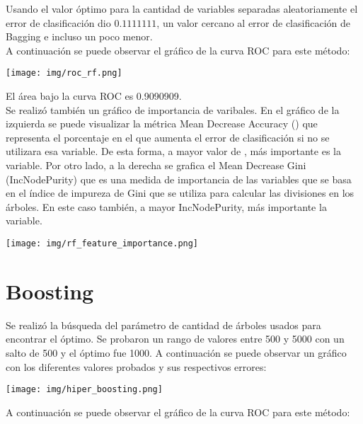 \documentclass{article}
\begin{document}
\noindent
Usando el valor óptimo para la cantidad de variables separadas aleatoriamente el error de clasificación dio $0.1111111$, un valor cercano al error de clasificación de Bagging e incluso un poco menor.\\

\noindent
A continuación se puede observar el gráfico de la curva ROC para este método:\\

\begin{center}
    \texttt{[image: img/roc\_rf.png]}
\end{center}

\noindent
El área bajo la curva ROC es 0.9090909.\\

\noindent
Se realizó también un gráfico de importancia de varibales. En el gráfico de la izquierda se puede visualizar la métrica Mean Decrease Accuracy () que representa el porcentaje en el que aumenta el error de clasificación si no se utilizara esa variable. De esta forma, a mayor valor de , más importante es la variable. Por otro lado, a la derecha se grafica el Mean Decrease Gini (IncNodePurity) que es una medida de importancia de las variables que se basa en el índice de impureza de Gini que se utiliza para calcular las divisiones en los árboles. En este caso también, a mayor IncNodePurity, más importante la variable.\\

\begin{center}
    \texttt{[image: img/rf\_feature\_importance.png]}
\end{center}


\section{Boosting}
Se realizó la búsqueda del parámetro de cantidad de árboles usados para encontrar el óptimo. Se probaron un rango de valores entre 500 y 5000 con un salto de 500 y el óptimo fue 1000. A continuación se puede observar un gráfico con los diferentes valores probados y sus respectivos errores:\\

\begin{center}
    \texttt{[image: img/hiper\_boosting.png]}
\end{center}

\noindent
A continuación se puede observar el gráfico de la curva ROC para este método:\\
\end{document}
